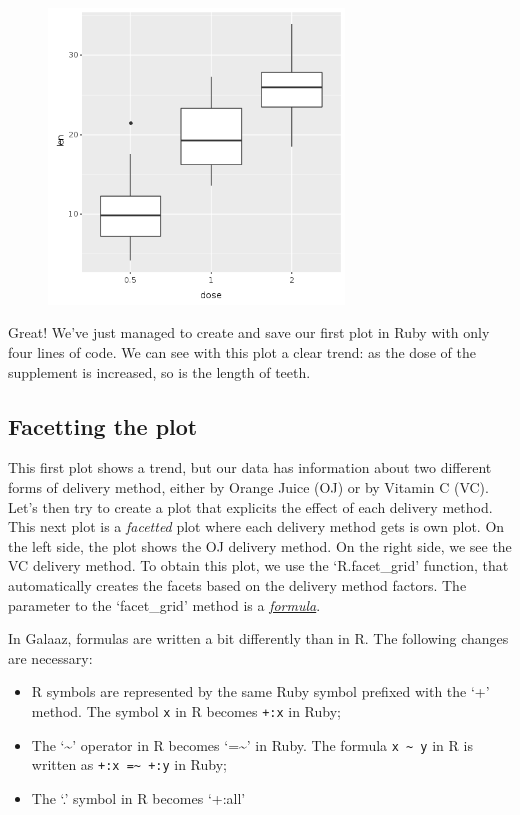 \documentclass[11pt,]{article}
\providecommand{\tightlist}{%
  \setlength{\itemsep}{0pt}\setlength{\parskip}{0pt}}
\begin{document}
\begin{figure}
\centering
\includegraphics[width=0.70000\textwidth]{figures/dose_len.png}
\caption{}
\end{figure}

Great! We've just managed to create and save our first plot in Ruby with
only four lines of code. We can see with this plot a clear trend: as the
dose of the supplement is increased, so is the length of teeth.

\subsection{Facetting the plot}\label{facetting-the-plot}

This first plot shows a trend, but our data has information about two
different forms of delivery method, either by Orange Juice (OJ) or by
Vitamin C (VC). Let's then try to create a plot that explicits the
effect of each delivery method. This next plot is a \emph{facetted} plot
where each delivery method gets is own plot. On the left side, the plot
shows the OJ delivery method. On the right side, we see the VC delivery
method. To obtain this plot, we use the `R.facet\_grid' function, that
automatically creates the facets based on the delivery method factors.
The parameter to the `facet\_grid' method is a
\href{https://thomasleeper.com/Rcourse/Tutorials/formulae.html}{\emph{formula}}.

In Galaaz, formulas are written a bit differently than in R. The
following changes are necessary:

\begin{itemize}
\tightlist
\item
  R symbols are represented by the same Ruby symbol prefixed with the
  `+' method. The symbol \texttt{x} in R becomes \texttt{+:x} in Ruby;
\item
  The `\textasciitilde{}' operator in R becomes `=\textasciitilde{}' in
  Ruby. The formula \texttt{x\ \textasciitilde{}\ y} in R is written as
  \texttt{+:x\ =\textasciitilde{}\ +:y} in Ruby;
\item
  The `.' symbol in R becomes `+:all'
\end{itemize}
\end{document}
